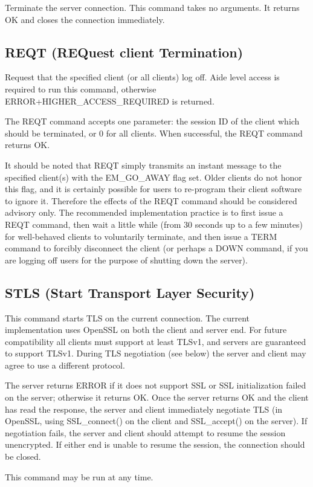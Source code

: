  Terminate the server connection.  This command takes no arguments.  It
returns OK and closes the connection immediately.




\subsection{REQT (REQuest client Termination)}

 Request that the specified client (or all clients) log off.  Aide level
access is required to run this command, otherwise ERROR+HIGHER_ACCESS_REQUIRED
is returned.

 The REQT command accepts one parameter: the session ID of the client which
should be terminated, or 0 for all clients.  When successful, the REQT command
returns OK.

It should be noted that REQT simply transmits an instant message to the
specified client(s) with the EM_GO_AWAY flag set.  Older clients do not honor
this flag, and it is certainly possible for users to re-program their client
software to ignore it.  Therefore the effects of the REQT command should be
considered advisory only.  The recommended implementation practice is to first
issue a REQT command, then wait a little while (from 30 seconds up to a few
minutes) for well-behaved clients to voluntarily terminate, and then issue a
TERM command to forcibly disconnect the client (or perhaps a DOWN command, if
you are logging off users for the purpose of shutting down the server).



\subsection{STLS (Start Transport Layer Security)}

 This command starts TLS on the current connection.  The current
implementation uses OpenSSL on both the client and server end.  For future
compatibility all clients must support at least TLSv1, and servers are
guaranteed to support TLSv1.  During TLS negotiation (see below) the server
and client may agree to use a different protocol.

 The server returns ERROR if it does not support SSL or SSL initialization
failed on the server; otherwise it returns OK.  Once the server returns OK and
the client has read the response, the server and client immediately negotiate
TLS (in OpenSSL, using SSL_connect() on the client and SSL_accept() on the
server).  If negotiation fails, the server and client should attempt to resume
the session unencrypted.  If either end is unable to resume the session, the
connection should be closed.

 This command may be run at any time.



